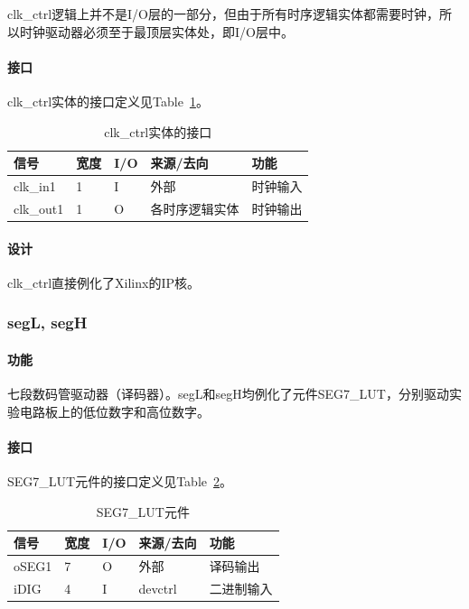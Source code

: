 \documentclass{article}
\begin{document}
\begin{spacing}{1.4}
clk\_ctrl逻辑上并不是I/O层的一部分，但由于所有时序逻辑实体都需要时钟，所以时钟驱动器必须至于最顶层实体处，即I/O层中。

\paragraph{接口}\mbox{}

clk\_ctrl实体的接口定义见Table~\ref{tb:clkctrl-interface}。
\begin{table}[!htb]
\begin{center}
\begin{tabular*}{15cm}{l|l|l|l|p{5cm}}
\hline
\textbf{信号}&\textbf{宽度}&\textbf{I/O}&\textbf{来源/去向}&\textbf{功能} \\
\hline clk\_in1                & 1                      & I     & 外部                  & 时钟输入 \\
\hline clk\_out1               & 1                      & O     & 各时序逻辑实体        & 时钟输出 \\
\hline
\end{tabular*}
\caption{clk\_ctrl实体的接口}
\label{tb:clkctrl-interface}
\end{center}
\end{table}

\paragraph{设计}\mbox{}

clk\_ctrl直接例化了Xilinx的IP核。

\subsubsection{segL, segH}

\paragraph{功能}\mbox{}

七段数码管驱动器（译码器）。segL和segH均例化了元件SEG7\_LUT，分别驱动实验电路板上的低位数字和高位数字。

\paragraph{接口}\mbox{}

SEG7\_LUT元件的接口定义见Table~\ref{tb:seg7lut-interface}。
\begin{table}[!htb]
\begin{center}
\begin{tabular*}{15cm}{l|l|l|l|p{5cm}}
\hline
\textbf{信号}&\textbf{宽度}&\textbf{I/O}&\textbf{来源/去向}&\textbf{功能} \\
\hline oSEG1                   & 7                      & O     & 外部                  & 译码输出 \\
\hline iDIG                    & 4                      & I     & devctrl             & 二进制输入 \\
\hline
\end{tabular*}
\caption{SEG7\_LUT元件}
\label{tb:seg7lut-interface}
\end{center}
\end{table}


\end{spacing}
\end{document}
